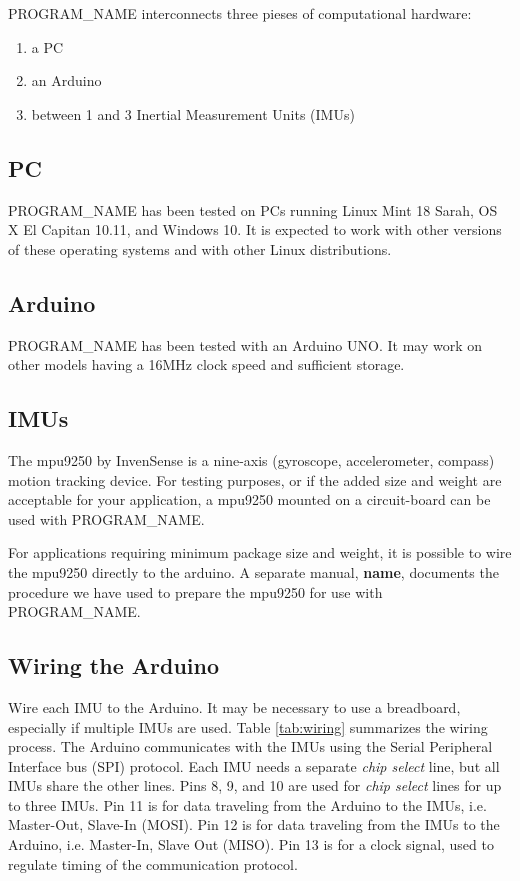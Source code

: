 \documentclass[11pt,letterpaper,article,oneside]{memoir}
\newcommand{\name}{PROGRAM\_NAME}
\begin{document}
\name{} interconnects three pieses of computational hardware:
\begin{enumerate}
  \item a PC
  \item an Arduino
  \item between 1 and 3 Inertial Measurement Units (IMUs)
\end{enumerate}

\subsection{PC}
\name{} has been tested on PCs running Linux Mint 18 Sarah, OS X El Capitan
10.11, and Windows 10. It is expected to work with other versions of these
operating systems and with other Linux distributions.

\subsection{Arduino}
\name{} has been tested with an Arduino UNO. It may work on other
models having a 16MHz clock speed and sufficient storage.


\subsection{IMUs}
The mpu9250 by InvenSense is a nine-axis (gyroscope, accelerometer, compass)
motion tracking device.  For testing purposes, or if the added size and weight
are acceptable for your application, a mpu9250 mounted on a circuit-board can be
used with \name{}.

For applications requiring minimum package size and weight, it is possible to
wire the mpu9250 directly to the arduino. A separate manual, \textbf{name},
documents the procedure we have used to prepare the mpu9250 for use with
\name{}.


\subsection{Wiring the Arduino}
\label{sec:wiring}
Wire each IMU to the Arduino. It may be necessary to use a breadboard,
especially if multiple IMUs are used. Table \ref{tab:wiring} summarizes the
wiring process. The Arduino communicates with the IMUs using the Serial
Peripheral Interface bus (SPI) protocol. Each IMU needs a separate \emph{chip
select} line, but all IMUs share the other lines. Pins 8, 9, and 10 are used for
\emph{chip select} lines for up to three IMUs. Pin 11 is for data traveling from
the Arduino to the IMUs, i.e. Master-Out, Slave-In (MOSI). Pin 12 is for data
traveling from the IMUs to the Arduino, i.e. Master-In, Slave Out (MISO). Pin 13
is for a clock signal, used to regulate timing of the communication protocol. 
\end{document}
